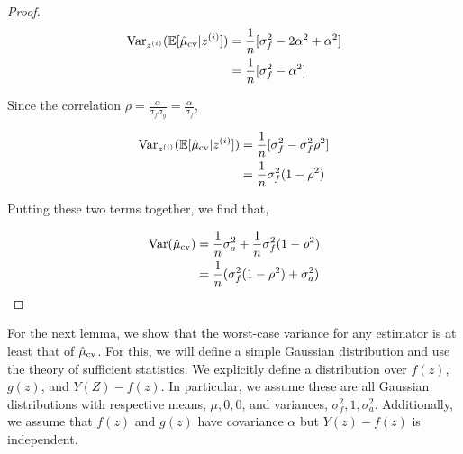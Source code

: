 \begin{proof}
\begin{align}
\operatorname{Var}_{z^{(i)}}( \mathbb{E}[\hat \mu_\text{cv} | z^{(i)}]) &= \frac{1}{n} [\sigma^2_f - 2 \alpha^2 + \alpha^2] \\
&=\frac{1}{n} [\sigma^2_f - \alpha^2]
\end{align}

Since the correlation $\rho = \frac{\alpha}{\sigma_f \sigma_g} = \frac{\alpha}{\sigma_f}$,

\begin{align}
\operatorname{Var}_{z^{(i)}}( \mathbb{E}[\hat \mu_\text{cv} | z^{(i)}]) &= \frac{1}{n} [\sigma^2_f - \sigma^2_f \rho^2] \\
&=\frac{1}{n} \sigma^2_f (1-\rho^2)
\end{align}

Putting these two terms together, we find that,

\begin{align}
\operatorname{Var}(\hat \mu_\text{cv}) &= \frac{1}{n} \sigma^2_a + \frac{1}{n} \sigma^2_f (1-\rho^2) \\
&= \frac{1}{n}(\sigma^2_f (1 - \rho^2) + \sigma^2_a)
\end{align}
\end{proof}

For the next lemma, we show that the worst-case variance for any estimator is at least that of $\hat \mu_\text{cv}$. For this, we will define a simple Gaussian distribution and use the theory of sufficient statistics. We explicitly define a distribution over $f(z)$, $g(z)$, and $Y(Z) - f(z)$. In particular, we assume these are all Gaussian distributions with respective means, $\mu, 0, 0$,  and variances, $\sigma^2_f, 1, \sigma^2_a$. Additionally, we assume that $f(z)$ and $g(z)$ have covariance $\alpha$ but $Y(z) - f(z)$ is independent.

